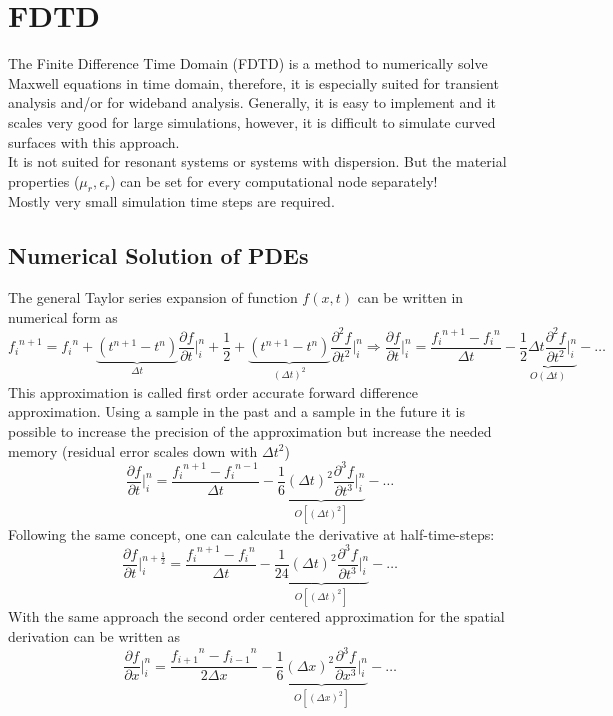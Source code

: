 \section{FDTD}
The Finite Difference Time Domain (FDTD) is a method to numerically solve Maxwell equations in time domain, therefore, it is especially suited for transient analysis and/or for wideband analysis. Generally, it is easy to implement and it scales very good for large simulations, however, it is difficult to simulate curved surfaces with this approach.\\
It is not suited for resonant systems or systems with dispersion. But the material properties ($\mu_r,\epsilon_r$) can be set for every computational node separately!\\ 
Mostly very small simulation time steps are required.

\subsection{Numerical Solution of PDEs}
The general Taylor series expansion of function $f(x,t)$ can be written in numerical form as 
\begin{equation*}
	{f_i}^{n+1}= {f_i}^n + \underbrace{\left(t^{n+1} - t^n\right)}_{\Delta t} \frac{\partial f}{\partial t} \bigg\rvert_{i}^{n} + \frac{1}{2} + \underbrace{\left(t^{n+1} - t^n\right)}_{\left(\Delta t\right)^2} \frac{\partial^2f}{\partial t^2} \bigg\rvert_{i}^{n} \Rightarrow \frac{\partial f}{\partial t} \bigg\rvert_{i}^{n} = \frac{{f_i}^{n+1}-{f_i}^n}{\Delta t} - \underbrace{\frac{1}{2}\Delta t \frac{\partial ^2 f}{\partial t^2}\bigg\rvert_{i}^{n}}_{O(\Delta t)} - \dots
\end{equation*}
This approximation is called first order accurate forward difference approximation. \newline Using a sample in the past and a sample in the future it is possible to increase the precision of the approximation but increase the needed memory (residual error scales down with $\Delta t^2$)
\begin{equation*}
	\frac{\partial f}{\partial t} \bigg\rvert_{i}^{n} = \frac{{f_i}^{n+1}-{f_i}^{n-1}}{\Delta t} - \underbrace{\frac{1}{6}\left(\Delta t\right)^2 \frac{\partial ^3 f}{\partial t^3}\bigg\rvert_{i}^{n}}_{O\left[(\Delta t)^2\right]} - \dots
\end{equation*}
Following the same concept, one can calculate the derivative at half-time-steps:
\begin{equation*}
	\frac{\partial f}{\partial t} \bigg\rvert_{i}^{n+\frac{1}{2}} = \frac{{f_i}^{n+1}-{f_i}^{n}}{\Delta t} - \underbrace{\frac{1}{24}\left(\Delta t\right)^2 \frac{\partial ^3 f}{\partial t^3}\bigg\rvert_{i}^{n}}_{O\left[(\Delta t)^2\right]} - \dots
\end{equation*}
With the same approach the second order centered approximation for the spatial derivation can be written as
\begin{equation*}
	\frac{\partial f}{\partial x} \bigg\rvert_{i}^{n} = \frac{{f_{i+1}}^{n}-{f_{i-1}}^{n}}{2\Delta x} - \underbrace{\frac{1}{6}\left(\Delta x\right)^2 \frac{\partial ^3 f}{\partial x^3}\bigg\rvert_{i}^{n}}_{O\left[(\Delta x)^2\right]} - \dots
\end{equation*}

